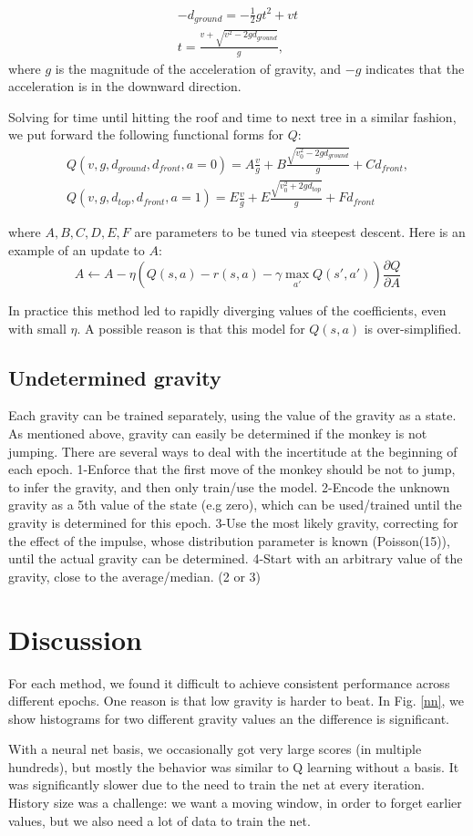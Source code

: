 \documentclass[11pt]{article}
\begin{document}
\begin{gather}
-d_{ground} = -\frac{1}{2}gt^2+vt\\
t = \frac{v+\sqrt{v^2-2gd_{ground}}}{g},
\end{gather}
where $g$ is the magnitude of the acceleration of gravity, and $-g$ indicates that the acceleration is in the downward direction.

Solving for time until hitting the roof and time to next tree in a similar fashion, we put forward the following functional forms for $Q$:
\begin{gather}
Q(v, g, d_{ground},d_{front}, a= 0) = A\frac{v}{g}+B\frac{\sqrt{v_0^2-2gd_{ground}}}{g}+Cd_{front},\\
Q(v, g, d_{top},d_{front}, a=1) = E\frac{v}{g}+E\frac{\sqrt{v_0^2+2gd_{top}}}{g}+Fd_{front}
\end{gather}

where $A,B,C,D,E,F$ are parameters to be tuned via steepest descent. Here is an example of an update to $A$:
\begin{equation}
A\leftarrow A-\eta(Q(s,a)-r(s,a)-\gamma\max_{a'}Q(s',a'))\frac{\partial Q}{\partial A}
\end{equation}

In practice this method led to rapidly diverging values of the coefficients, even with small $\eta$. A possible reason is that this model for $Q(s,a)$ is over-simplified.

\subsection{Undetermined gravity
}
Each gravity can be trained separately, using the value of the gravity as a state. As mentioned above, gravity can easily be determined if the monkey is not jumping. There are several ways to deal with the incertitude at the beginning of each epoch.
1-Enforce that the first move of the monkey should be not to jump, to infer the gravity, and then only train/use the model. 
2-Encode the unknown gravity as a 5th value of the state (e.g zero), which can be used/trained until the gravity is determined for this epoch.
3-Use the most likely gravity, correcting for the effect of the impulse, whose distribution parameter is known (Poisson(15)), until the actual gravity can be determined.
4-Start with an arbitrary value of the gravity, close to the average/median. (2 or 3)

\section{Discussion} 
For each method, we found it difficult to achieve consistent performance across different epochs. One reason is that low gravity is harder to beat. In Fig. \ref{nn}, we show histograms for two different gravity values an the difference is significant.

With a neural net basis, we occasionally got very large scores (in multiple hundreds), but mostly the behavior was similar to Q learning without a basis. It was significantly slower due to the need to train the net at every iteration. History size was a challenge: we want a moving window, in order to forget earlier values, but we also need a lot of data to train the net. 
\end{document}
